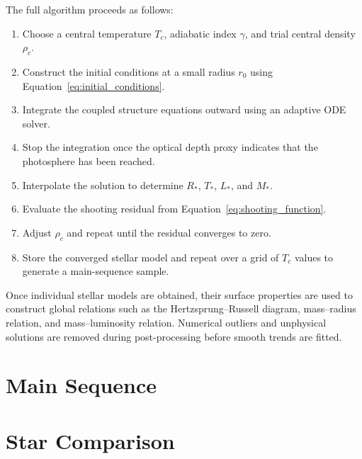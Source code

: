 \documentclass[12pt]{article}
\begin{document}
The full algorithm proceeds as follows:
\begin{enumerate}
    \item Choose a central temperature $T_c$, adiabatic index $\gamma$, and trial central density $\rho_c$.
    \item Construct the initial conditions at a small radius $r_0$ using Equation~\eqref{eq:initial_conditions}.
    \item Integrate the coupled structure equations outward using an adaptive ODE solver.
    \item Stop the integration once the optical depth proxy indicates that the photosphere has been reached.
    \item Interpolate the solution to determine $R_\ast$, $T_\ast$, $L_\ast$, and $M_\ast$.
    \item Evaluate the shooting residual from Equation~\eqref{eq:shooting_function}.
    \item Adjust $\rho_c$ and repeat until the residual converges to zero.
    \item Store the converged stellar model and repeat over a grid of $T_c$ values to generate a main-sequence sample.
\end{enumerate}

Once individual stellar models are obtained, their surface properties are used to construct global relations such as the Hertzsprung--Russell diagram, mass--radius relation, and mass--luminosity relation. Numerical outliers and unphysical solutions are removed during post-processing before smooth trends are fitted.


\clearpage


\section{Main Sequence}



\clearpage


\section{Star Comparison}
\end{document}
